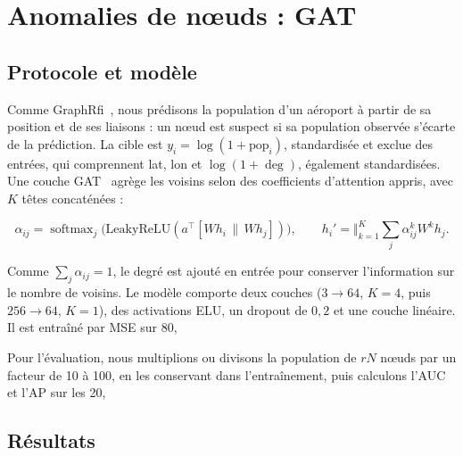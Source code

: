 \clearpage
\section{Anomalies de nœuds : GAT}
\label{sec:gat}

\subsection{Protocole et modèle}

Comme GraphRfi~\cite{zhang2020graphrfi}, nous prédisons la population d'un aéroport à partir de sa position et de ses liaisons : un nœud est suspect si sa population observée s'écarte de la prédiction. La cible est $y_i=\log(1+\mathrm{pop}_i)$, standardisée et exclue des entrées, qui comprennent lat, lon et $\log(1+\deg)$, également standardisées. Une couche GAT~\cite{velickovic2018gat} agrège les voisins selon des coefficients d'attention appris, avec $K$ têtes concaténées :

$$
\alpha_{ij}=\operatorname{softmax}_{j}\big(\mathrm{LeakyReLU}(a^\top[Wh_i\,\|\,Wh_j])\big),\qquad
h_i'=\big\Vert_{k=1}^{K}\textstyle\sum_{j}\alpha^{k}_{ij}W^{k}h_j.
$$

Comme $\sum_j\alpha_{ij}=1$, le degré est ajouté en entrée pour conserver l'information sur le nombre de voisins. Le modèle comporte deux couches ($3\to64$, $K=4$, puis $256\to64$, $K=1$), des activations ELU, un dropout de $0{,}2$ et une couche linéaire. Il est entraîné par MSE sur 80,%

Pour l'évaluation, nous multiplions ou divisons la population de $rN$ nœuds par un facteur de 10 à 100, en les conservant dans l'entraînement, puis calculons l'AUC et l'AP sur les 20,%


\subsection{Résultats}

